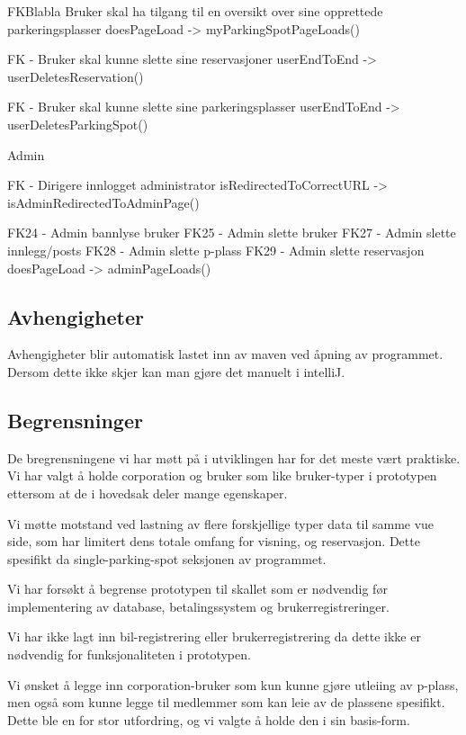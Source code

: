 \documentclass[12pt]{article}
\begin{document}
    FKBlabla Bruker skal ha tilgang til en oversikt over sine 
        opprettede parkeringsplasser
        doesPageLoad
        -> myParkingSpotPageLoads()

    FK - Bruker skal kunne slette sine reservasjoner
        userEndToEnd
        -> userDeletesReservation()

    FK - Bruker skal kunne slette sine parkeringsplasser
        userEndToEnd
        -> userDeletesParkingSpot()

    Admin

    FK - Dirigere innlogget administrator
        isRedirectedToCorrectURL
        -> isAdminRedirectedToAdminPage()

    FK24 - Admin bannlyse bruker
    FK25 - Admin slette bruker
    FK27 - Admin slette innlegg/posts
    FK28 - Admin slette p-plass
    FK29 - Admin slette reservasjon
        doesPageLoad
        -> adminPageLoads()


    \subsection{Avhengigheter}
    Avhengigheter blir automatisk lastet inn av maven ved åpning av programmet. Dersom dette ikke skjer kan man gjøre det manuelt i intelliJ.

    \subsection{Begrensninger}
    De bregrensningene vi har møtt på i utviklingen har for det meste vært praktiske. Vi har valgt å holde corporation og bruker som like bruker-typer i prototypen ettersom at de i hovedsak deler mange egenskaper.
    
    Vi møtte motstand ved lastning av flere forskjellige typer data til samme vue side, som har limitert dens totale omfang for visning, og reservasjon. Dette spesifikt da single-parking-spot seksjonen av programmet.
    
    Vi har forsøkt å begrense prototypen til skallet som er nødvendig før implementering av database, betalingssystem og brukerregistreringer.
    
    Vi har ikke lagt inn bil-registrering eller brukerregistrering da dette ikke er nødvendig for funksjonaliteten i prototypen. 
    
    Vi ønsket å legge inn corporation-bruker som kun kunne gjøre utleiing av p-plass, men også som kunne legge til medlemmer som kan leie av de plassene spesifikt. Dette ble en for stor utfordring, og vi valgte å holde den i sin basis-form.
    
\end{document}
